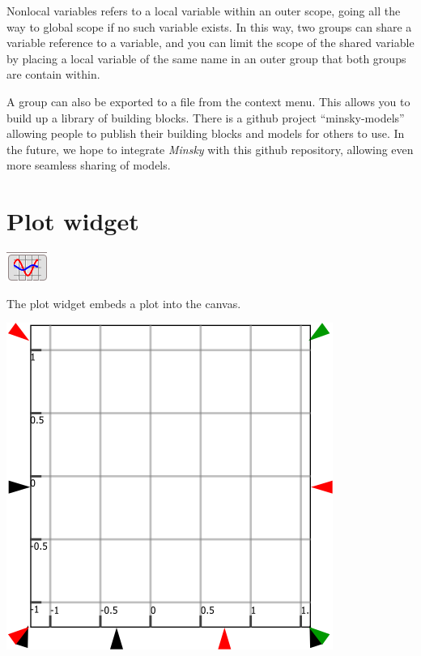 Nonlocal variables refers to a local variable within an outer scope,
going all the way to global scope if no such variable exists. In this
way, two groups can share a variable reference to a variable, and
you can limit the scope of the shared variable by placing a local
variable of the same name in an outer group that both groups are contain
within.

A group can also be exported to a file from the context menu. This
allows you to build up a library of building blocks. There is a github
project ``minsky-models'' allowing people to publish their building
blocks and models for others to use. In the future, we hope to integrate
\emph{Minsky} with this github repository, allowing even more seamless
sharing of models.

\section{Plot widget}

\label{PlotWidget}

\includegraphics{images/plotWidget}

The plot widget embeds a plot into the canvas.
\begin{center}
\includegraphics{images/Plot} 
\par\end{center}

